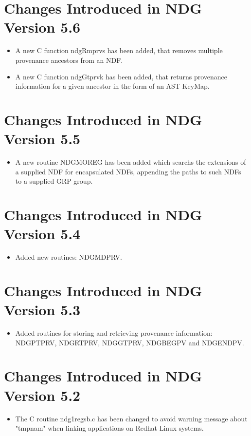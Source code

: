 \documentclass[twoside,11pt]{article}
\renewcommand{\_}{\texttt{\symbol{95}}}
\begin{document}
\section{Changes Introduced in NDG Version 5.6}
\begin{itemize}
   \item A new C function ndgRmprvs has been added, that removes multiple
         provenance ancestors from an NDF.
   \item A new C function ndgGtprvk has been added, that returns provenance
         information for a given ancestor in the form of an AST KeyMap.
\end{itemize}

\section{Changes Introduced in NDG Version 5.5}
\begin{itemize}
   \item A new routine NDG\_MOREG has been added which searchs the
         extensions of a supplied NDF for encapsulated NDFs, appending
         the paths to such NDFs to a supplied GRP group.
\end{itemize}

\section{Changes Introduced in NDG Version 5.4}
\begin{itemize}
   \item Added new routines: NDG\_MDPRV.
\end{itemize}

\section{Changes Introduced in NDG Version 5.3}
\begin{itemize}
   \item Added routines for storing and retrieving provenance information:
         NDG\_PTPRV, NDG\_RTPRV, NDG\_GTPRV, NDG\_BEGPV and NDG\_ENDPV.
\end{itemize}

\section{Changes Introduced in NDG Version 5.2}
\begin{itemize}
   \item The C routine ndg1\_regsb.c has been changed to avoid warning 
         message about "tmpnam" when linking applications on Redhat Linux 
	 systems.
\end{itemize}
\end{document}
